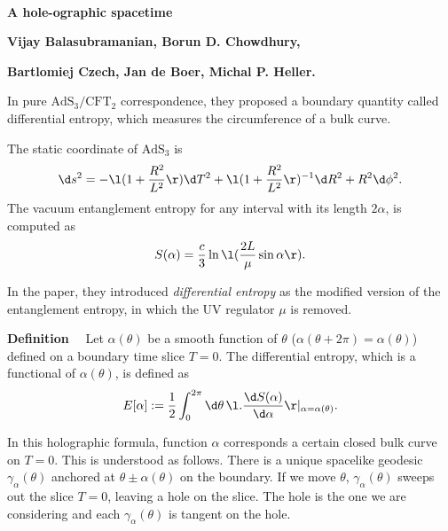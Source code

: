 \documentclass[12pt]{article}
\date{}
\renewcommand{\thefootnote}{\fnsymbol{footnote}}
\newcommand{\AdS}[0]{\textrm{AdS}}
\newcommand{\CFT}[0]{\textrm{CFT}}
\begin{document}
{\Large{}\\[2mm]
\textbf{A hole-ographic spacetime
\cite{Balasubramanian:2013lsa}}
}

\noindent
\hfill
\textbf{Vijay Balasubramanian, Borun D. Chowdhury,}

\hfill
\textbf{Bartlomiej Czech, Jan de Boer, Michal P. Heller.}

\renewcommand{\thefootnote}{\arabic{footnote})}
\setcounter{footnote}{0}
\vspace{12pt}

In pure $\AdS_3/ \CFT_2$ correspondence, 
they proposed a boundary quantity called differential entropy, which measures the circumference of a bulk curve.

The static coordinate of $\AdS_3$ is
\begin{align}
	\d s^2 = -\l(1+\frac{R^2}{L^2}\r)\d T^2 + \l(1 + \frac{R^2}{L^2}\r)^{-1}\d R^2 + R^2 \d \phi^2.
\end{align}
The vacuum entanglement entropy for any interval with its length $2\alpha$, is computed as
\begin{align}
	S(\alpha) = \frac{c}{3}\ln\l(\frac{2L}{\mu}\sin\alpha\r).
\end{align}

In the paper, they introduced \textit{differential entropy} as the modified version of the entanglement entropy, 
in which the UV regulator $\mu$ is removed.

\noindent
\textbf{Definition}~~
Let $\alpha(\theta)$ be a smooth function of $\theta$ ($\alpha(\theta+2\pi) = \alpha(\theta)$) 
defined on a boundary time slice $T=0$.
The differential entropy, which is a functional of $\alpha(\theta)$, is defined as
\begin{align}
	E[\alpha] := \frac{1}{2}\int_0^{2\pi}\d\theta\,\l.\frac{\d S(\alpha)}{\d \alpha}\r|_{\alpha = \alpha(\theta)}.
\end{align}

\noindent
In this holographic formula, function $\alpha$ corresponds a certain closed bulk curve on $T=0$.
This is understood as follows.
There is a unique spacelike geodesic $\gamma_\alpha(\theta)$ anchored at $\theta \pm \alpha(\theta)$ on the boundary.
If we move $\theta$, $\gamma_\alpha(\theta)$ sweeps out the slice $T=0$, leaving a hole on the slice.
The hole is the one we are considering and each $\gamma_\alpha(\theta)$ is tangent on the hole.
\end{document}

